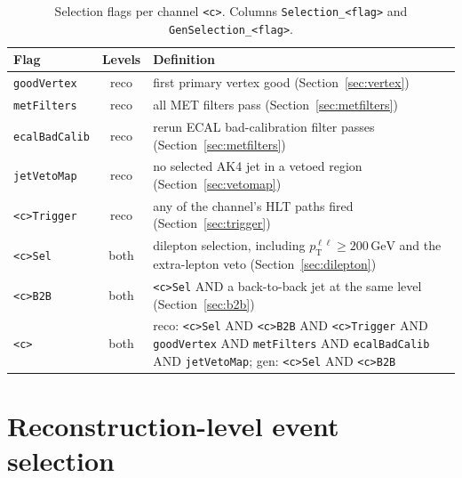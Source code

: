 \documentclass[11pt]{article}
\newcommand{\pt}{p_{\mathrm{T}}}
\newcommand{\GeV}{\ensuremath{\,\mathrm{GeV}}}
\newcommand{\ptll}{\pt^{\ell\ell}}
\newcommand{\code}[1]{\texttt{#1}}
\begin{document}
\begin{table}[htbp]
\centering
\caption{Selection flags per channel \code{<c>}. Columns \code{Selection\_<flag>} and \code{GenSelection\_<flag>}.}
\label{tab:flags}
\small
\begin{tabularx}{\textwidth}{lc>{\raggedright\arraybackslash}X}
\toprule
Flag & Levels & Definition \\
\midrule
\code{goodVertex} & reco & first primary vertex good (Section~\ref{sec:vertex}) \\
\code{metFilters} & reco & all MET filters pass (Section~\ref{sec:metfilters}) \\
\code{ecalBadCalib} & reco & rerun ECAL bad-calibration filter passes (Section~\ref{sec:metfilters}) \\
\code{jetVetoMap} & reco & no selected AK4 jet in a vetoed region (Section~\ref{sec:vetomap}) \\
\code{<c>Trigger} & reco & any of the channel's HLT paths fired (Section~\ref{sec:trigger}) \\
\code{<c>Sel} & both & dilepton selection, including $\ptll \geq 200\GeV$ and the extra-lepton veto (Section~\ref{sec:dilepton}) \\
\code{<c>B2B} & both & \code{<c>Sel} AND a back-to-back jet at the same level (Section~\ref{sec:b2b}) \\
\code{<c>} & both & reco: \code{<c>Sel} AND \code{<c>B2B} AND \code{<c>Trigger} AND \code{goodVertex} AND
  \code{metFilters} AND \code{ecalBadCalib} AND \code{jetVetoMap}; gen: \code{<c>Sel} AND \code{<c>B2B} \\
\bottomrule
\end{tabularx}
\end{table}

\section{Reconstruction-level event selection}
\label{sec:reco}
\end{document}
